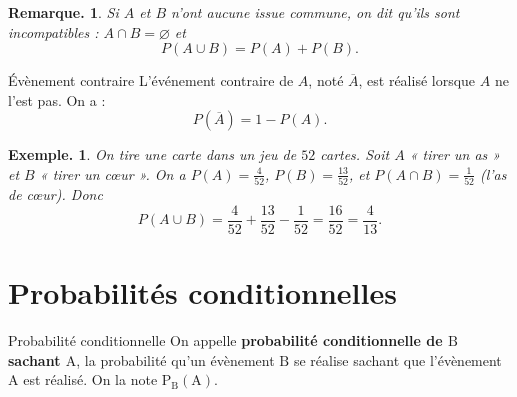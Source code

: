 \documentclass[12pt]{article}
\theoremstyle{break}
\newtheorem*{example}{Exemple.}
\newtheorem*{remark}{Remarque.}
\begin{document}
\begin{remark}
Si $A$ et $B$ n'ont aucune issue commune, on dit qu'ils sont \emph{incompatibles} : $A\cap B=\varnothing$ et
\[
P(A\cup B) = P(A)+P(B).
\]
\end{remark}
 
\begin{minipage}{0.6\linewidth}
\begin{definition}{Évènement contraire}{}
  L'événement contraire de $A$, noté $\overline{A}$, est réalisé lorsque $A$ ne l'est pas. On a :
  \[
  P(\overline{A}) = 1 - P(A).
  \]
\end{definition}
\end{minipage}
\hfill
\begin{minipage}{0.37\linewidth}

\begin{center}
\end{center}
  
\end{minipage}
 
\begin{example}
On tire une carte dans un jeu de $52$ cartes. Soit $A$ « tirer un as » et $B$ « tirer un c\oe ur ». On a $P(A)=\frac{4}{52}$, $P(B)=\frac{13}{52}$, et $P(A\cap B)=\frac{1}{52}$ (l'as de c\oe ur). Donc
\[
P(A\cup B) = \frac{4}{52}+\frac{13}{52}-\frac{1}{52} = \frac{16}{52} = \frac{4}{13}.
\]
\end{example} 



\section{Probabilités conditionnelles}

\begin{definition}{Probabilité conditionnelle}{}
  On appelle \textbf{probabilité conditionnelle de ${\mathrm B}$ sachant ${\mathrm A}$}, la probabilité qu'un évènement ${\mathrm B}$ se réalise sachant que l'évènement ${\mathrm A}$ est réalisé. On la note ${\mathrm P}_{\mathrm B}({\mathrm A})$.
\end{definition}
\end{document}
